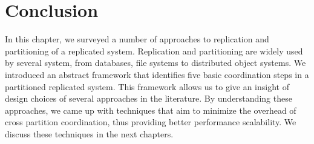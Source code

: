 \section{Conclusion}

In this chapter, we surveyed a number of approaches to replication and
partitioning of a replicated system. Replication and partitioning are widely used
by several system, from databases, file systems to distributed object systems.
We introduced an abstract framework that identifies five basic coordination
steps in a partitioned replicated system. This framework allows us to give an
insight of design choices of several approaches in the literature. By
understanding these approaches, we came up with techniques that aim to
minimize the overhead of cross partition coordination, thus providing better
performance scalability.
We discuss these techniques in the next chapters.



















